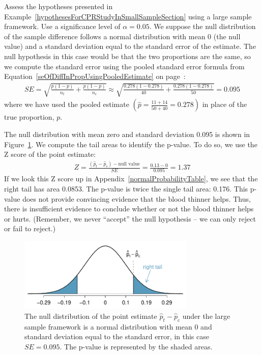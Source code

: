 \begin{example}{Assess the hypotheses presented in Example~\ref{hypothesesForCPRStudyInSmallSampleSection} using a large sample framework. Use a significance level of $\alpha=0.05$.}
We suppose the null distribution of the sample difference follows a normal distribution with mean 0 (the null value) and a standard deviation equal to the standard error of the estimate. The null hypothesis in this case would be that the two proportions are the same, so we compute the standard error using the pooled standard error formula from Equation~\eqref{seOfDiffInPropUsingPooledEstimate} on page~\pageref{seOfDiffInPropUsingPooledEstimate}:
\begin{align*}
SE = \sqrt{\frac{p(1-p)}{n_t} + \frac{p(1-p)}{n_c}}
	\approx \sqrt{\frac{0.278(1-0.278)}{40} + \frac{0.278(1-0.278)}{50}} = 0.095
\end{align*}
where we have used the pooled estimate $\left( \hat{p} = \frac{11+14}{50 + 40} = 0.278 \right)$ in place of the true proportion, $p$.

The null distribution with mean zero and standard deviation 0.095 is shown in Figure~\ref{pValueCPRStudyLargeSampleAnalysisInSmallSampleSection}. We compute the tail areas to identify the p-value. To do so, we use the Z score of the point estimate:
\begin{align*}
Z = \frac{(\hat{p}_t - \hat{p}_c) - \text{null value}}{SE} = \frac{0.13 - 0}{0.095} = 1.37
\end{align*}
If we look this Z score up in Appendix~\ref{normalProbabilityTable}, we see that the right tail has area 0.0853. The p-value is twice the single tail area: 0.176. This p-value does not provide convincing evidence that the blood thinner helps. Thus, there is insufficient evidence to conclude whether or not the blood thinner helps or hurts. (Remember, we never ``accept'' the null hypothesis -- we can only reject or fail to reject.)
\end{example}
\begin{figure}[ht]
\centering
\includegraphics[width=0.75\textwidth]{ch_inference_for_props/figures/pValueCPRStudyLargeSampleAnalysisInSmallSampleSection/pValueCPRStudyLargeSampleAnalysisInSmallSampleSection}
\caption{The null distribution of the point estimate $\hat{p}_t - \hat{p}_c$ under the large sample framework is a normal distribution with mean $0$ and standard deviation equal to the standard error, in this case $SE=0.095$. The p-value is represented by the shaded areas.}
\label{pValueCPRStudyLargeSampleAnalysisInSmallSampleSection}
\end{figure}


